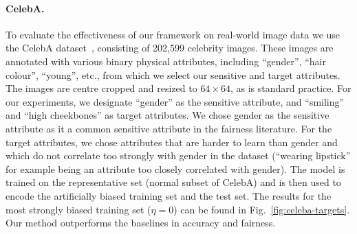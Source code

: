 \paragraph{CelebA.}
%
To evaluate the effectiveness of our framework on real-world image data we use the CelebA
dataset~\citep{liu2015faceattributes}, consisting of 202,599 celebrity images. 
%
These images are annotated with various binary physical  attributes, including ``gender'', ``hair
colour'', ``young'', etc., from which we select our sensitive and target attributes. 
%
The images are centre cropped and resized to $64\times64$, as is standard practice. 
%
For our experiments, we designate ``gender'' as the sensitive attribute, and ``smiling'' and ``high
cheekbones'' as target attributes. 
%
We chose gender as the sensitive attribute as it a common sensitive attribute in the fairness
literature. 
%
For the target attributes, we chose attributes that are harder to learn than gender and which do
not correlate too strongly with gender in the dataset (``wearing lipstick'' for example being an
attribute too closely correlated with gender).
%
The model is trained on the representative set (normal subset of CelebA) and is then used to encode
the artificially biased training set and the test set. The results for the most strongly biased
training set ($\eta=0$) can be found in Fig.~\ref{fig:celeba-targets}. Our method outperforms the
baselines in accuracy and fairness.

